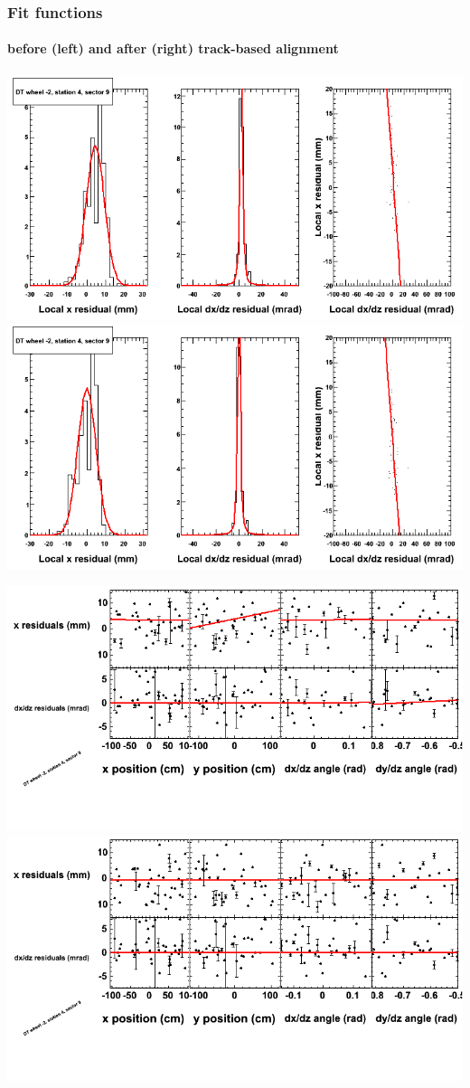 \documentclass[compress]{beamer}
\begin{document}
\begin{frame}
\frametitle{Fit functions}
\framesubtitle{before (left) and after (right) track-based alignment}
\includegraphics[width=0.5\linewidth]{fitfunctions_re01/MBwhAst4sec09_bellcurves.png} \includegraphics[width=0.5\linewidth]{fitfunctions_re05/MBwhAst4sec09_bellcurves.png}

\includegraphics[width=0.5\linewidth]{fitfunctions_re01/MBwhAst4sec09_polynomials.png} \includegraphics[width=0.5\linewidth]{fitfunctions_re05/MBwhAst4sec09_polynomials.png}
\end{frame}
\end{document}
